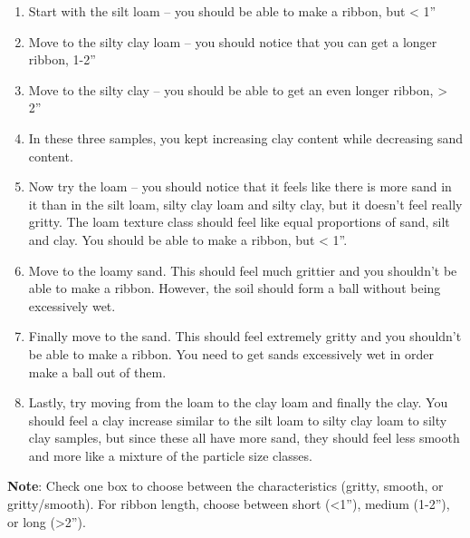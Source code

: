\documentclass[
  letterpaper,
  twocolumn,
  portrait]{scrbook}
\begin{document}
\begin{enumerate}
\def\labelenumi{\arabic{enumi}.}
\item
  Start with the silt loam -- you should be able to make a ribbon, but
  \textless{} 1''
\item
  Move to the silty clay loam -- you should notice that you can get a
  longer ribbon, 1-2''
\item
  Move to the silty clay -- you should be able to get an even longer
  ribbon, \textgreater{} 2''
\item
  In these three samples, you kept increasing clay content while
  decreasing sand content.
\item
  Now try the loam -- you should notice that it feels like there is more
  sand in it than in the silt loam, silty clay loam and silty clay, but
  it doesn't feel really gritty. The loam texture class should feel like
  equal proportions of sand, silt and clay. You should be able to make a
  ribbon, but \textless{} 1''.
\item
  Move to the loamy sand. This should feel much grittier and you
  shouldn't be able to make a ribbon. However, the soil should form a
  ball without being excessively wet.
\item
  Finally move to the sand. This should feel extremely gritty and you
  shouldn't be able to make a ribbon. You need to get sands excessively
  wet in order make a ball out of them.
\item
  Lastly, try moving from the loam to the clay loam and finally the
  clay. You should feel a clay increase similar to the silt loam to
  silty clay loam to silty clay samples, but since these all have more
  sand, they should feel less smooth and more like a mixture of the
  particle size classes.
\end{enumerate}

\textbf{Note}: Check one box to choose between the characteristics
(gritty, smooth, or gritty/smooth). For ribbon length, choose between
short (\textless1''), medium (1-2''), or long (\textgreater2'').

 
  \providecommand{\huxb}[2]{\arrayrulecolor[RGB]{#1}\global\arrayrulewidth=#2pt}
  \providecommand{\huxvb}[2]{\color[RGB]{#1}\vrule width #2pt}
  \providecommand{\huxtpad}[1]{\rule{0pt}{#1}}
  \providecommand{\huxbpad}[1]{\rule[-#1]{0pt}{#1}}
\end{document}
